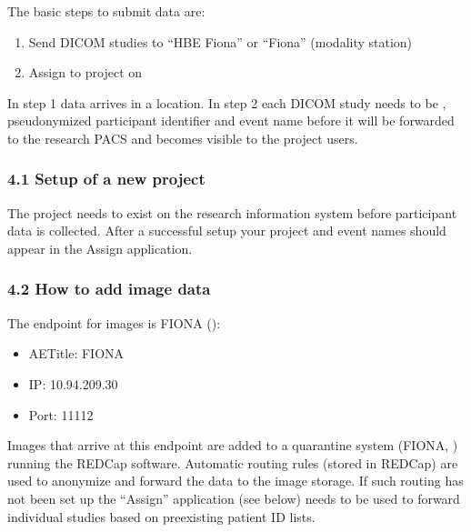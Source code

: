 \documentclass[letterpaper,10pt,english]{sphinxmanual}
\begin{document}
\sphinxAtStartPar
The basic steps to submit data are:
\begin{enumerate}
%
\item {} 
\sphinxAtStartPar
Send DICOM studies to “HBE Fiona” or “Fiona” (modality station)

\item {} 
\sphinxAtStartPar
Assign to project on 

\end{enumerate}

\sphinxAtStartPar
In step 1 data arrives in a  location. In step 2 each DICOM study needs to be , pseudonymized participant identifier and event name before it will be forwarded to the research PACS and becomes visible to the project users.


\subsubsection{4.1 Setup of a new project}
\label{\detokenize{EndUser/end-user:setup-of-a-new-project}}
\sphinxAtStartPar
The project needs to exist on the research information system before participant data is collected. After a successful setup your project and event names should appear in the Assign application.


\subsubsection{4.2 How to add image data}
\label{\detokenize{EndUser/end-user:how-to-add-image-data}}
\sphinxAtStartPar
The end\sphinxhyphen{}point for images is FIONA ():
\begin{itemize}
\item {} 
\sphinxAtStartPar
AETitle: FIONA

\item {} 
\sphinxAtStartPar
IP: 10.94.209.30

\item {} 
\sphinxAtStartPar
Port: 11112

\end{itemize}

\sphinxAtStartPar
Images that arrive at this endpoint are added to a quarantine system (FIONA, ) running the REDCap software. Automatic routing rules (stored in REDCap) are used to anonymize and forward the data to the image storage. If such routing has not been set up the “Assign” application (see below) needs to be used to forward individual studies based on pre\sphinxhyphen{}existing patient ID lists.
\end{document}
